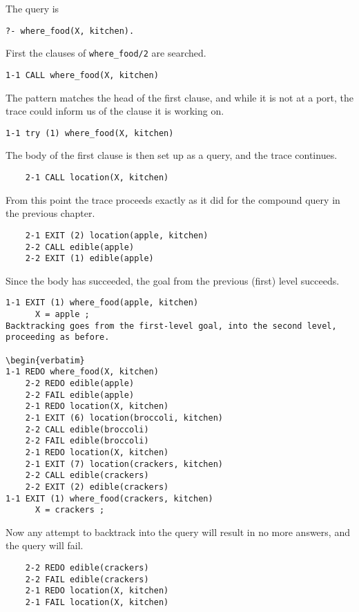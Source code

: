 The query is
\begin{verbatim}
?- where_food(X, kitchen).
\end{verbatim}
First the clauses of \verb'where_food/2' are searched.

\begin{verbatim}
1-1 CALL where_food(X, kitchen)
\end{verbatim}
The pattern matches the head of the first clause, and while it is not at a port,
the trace could inform us of the clause it is working on.

\begin{verbatim}
1-1 try (1) where_food(X, kitchen)
\end{verbatim}
The body of the first clause is then set up as a query, and the trace continues.

\begin{verbatim}
    2-1 CALL location(X, kitchen)
\end{verbatim}
From this point the trace proceeds exactly as it did for the compound query in
the previous chapter.

\begin{verbatim}
    2-1 EXIT (2) location(apple, kitchen)
    2-2 CALL edible(apple)
    2-2 EXIT (1) edible(apple)
\end{verbatim}
Since the body has succeeded, the goal from the previous (first) level succeeds.

\begin{verbatim}
1-1 EXIT (1) where_food(apple, kitchen)
      X = apple ;
Backtracking goes from the first-level goal, into the second level, proceeding as before.

\begin{verbatim}
1-1 REDO where_food(X, kitchen)
    2-2 REDO edible(apple)
    2-2 FAIL edible(apple)
    2-1 REDO location(X, kitchen)
    2-1 EXIT (6) location(broccoli, kitchen)
    2-2 CALL edible(broccoli)
    2-2 FAIL edible(broccoli)
    2-1 REDO location(X, kitchen)
    2-1 EXIT (7) location(crackers, kitchen)
    2-2 CALL edible(crackers)
    2-2 EXIT (2) edible(crackers)
1-1 EXIT (1) where_food(crackers, kitchen)
      X = crackers ;
\end{verbatim}
Now any attempt to backtrack into the query will result in no more answers, and
the query will fail.

\begin{verbatim}
    2-2 REDO edible(crackers)
    2-2 FAIL edible(crackers)
    2-1 REDO location(X, kitchen)
    2-1 FAIL location(X, kitchen)
\end{verbatim}

